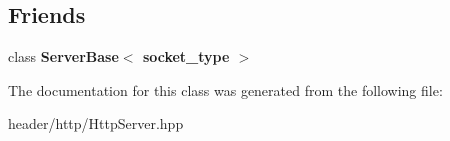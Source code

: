 \subsection*{Friends}
\begin{DoxyCompactItemize}
\item 
\mbox{\label{classhttp_1_1_server_base_1_1_content_a01d54a7e16ca437c98ec571deca98dfc}} 
class {\bfseries Server\+Base$<$ socket\+\_\+type $>$}
\end{DoxyCompactItemize}


The documentation for this class was generated from the following file\+:\begin{DoxyCompactItemize}
\item 
header/http/Http\+Server.\+hpp\end{DoxyCompactItemize}
